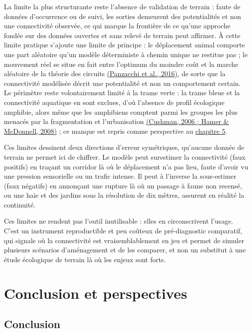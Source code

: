 \documentclass[a4paper,11pt]{report}
\begin{document}
La limite la plus structurante reste l'absence de validation de terrain : faute de données d'occurrence ou de suivi, les sorties demeurent des potentialités et non une connectivité observée, ce qui marque la frontière de ce qu'une approche fondée sur des données ouvertes et sans relevé de terrain peut affirmer. À cette limite pratique s'ajoute une limite de principe : le déplacement animal comporte une part aléatoire qu'un modèle déterministe à chemin unique ne restitue pas ; le mouvement réel se situe en fait entre l'optimum du moindre coût et la marche aléatoire de la théorie des circuits \hyperref[sec:bibliographie]{(Panzacchi et al., 2016)}, de sorte que la connectivité modélisée décrit une potentialité et non un comportement certain. Le périmètre reste volontairement limité à la trame verte : la trame bleue et la connectivité aquatique en sont exclues, d'où l'absence de profil écologique amphibie, alors même que les amphibiens comptent parmi les groupes les plus menacés par la fragmentation et l'urbanisation \hyperref[sec:bibliographie]{(Cushman, 2006 ; Hamer \& McDonnell, 2008)} ; ce manque est repris comme perspective au \hyperref[chap:5]{chapitre 5}.

Ces limites dessinent deux directions d'erreur symétriques, qu'aucune donnée de terrain ne permet ici de chiffrer. Le modèle peut surestimer la connectivité (faux positifs) en traçant un corridor là où le déplacement n'a pas lieu, faute d'avoir vu une pression sensorielle ou un trafic intense. Il peut à l'inverse la sous-estimer (faux négatifs) en annonçant une rupture là où un passage à faune non recensé, ou une haie et des jardins sous la résolution de dix mètres, assurent en réalité la continuité.

Ces limites ne rendent pas l'outil inutilisable : elles en circonscrivent l'usage. C'est un instrument reproductible et peu coûteux de pré-diagnostic comparatif, qui signale où la connectivité est vraisemblablement en jeu et permet de simuler plusieurs scénarios d'aménagement et de les comparer, et non un substitut à une étude écologique de terrain là où les enjeux sont forts.

\chapter{Conclusion et perspectives}\label{chap:5}

\section{Conclusion}\label{sec:5.1}
\end{document}
